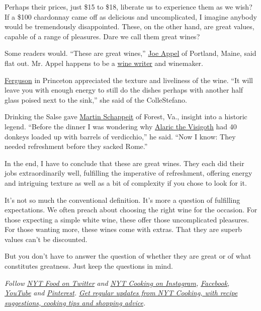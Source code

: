 Perhaps their prices, just \$15 to \$18, liberate us to experience them
as we wish? If a \$100 chardonnay came off as delicious and
uncomplicated, I imagine anybody would be tremendously disappointed.
These, on the other hand, are great values, capable of a range of
pleasures. Dare we call them great wines?

Some readers would. ``These are great wines,''
\href{https://www.nytimes3xbfgragh.onion/2020/07/02/dining/drinks/wine-school-assignment-verdicchio-di-matelica.html\#commentsContainer\&permid=108034206}{Joe
Appel} of Portland, Maine, said flat out. Mr. Appel happens to be a
\href{https://twitter.com/joeyappel?lang=en}{wine writer} and winemaker.

\href{https://www.nytimes3xbfgragh.onion/2020/07/02/dining/drinks/wine-school-assignment-verdicchio-di-matelica.html\#commentsContainer\&permid=108072656}{Ferguson}
in Princeton appreciated the texture and liveliness of the wine. ``It
will leave you with enough energy to still do the dishes perhaps with
another half glass poised next to the sink,'' she said of the
ColleStefano.

Drinking the Salse gave
\href{https://www.nytimes3xbfgragh.onion/2020/07/02/dining/drinks/wine-school-assignment-verdicchio-di-matelica.html\#commentsContainer\&permid=108094105}{Martin
Schappeit} of Forest, Va., insight into a historic legend. ``Before the
dinner I was wondering why
\href{https://www.empson.com/territory/marche/verdicchio/}{Alaric the
Visigoth} had 40 donkeys loaded up with barrels of verdicchio,'' he
said. ``Now I know: They needed refreshment before they sacked Rome.''

In the end, I have to conclude that these are great wines. They each did
their jobs extraordinarily well, fulfilling the imperative of
refreshment, offering energy and intriguing texture as well as a bit of
complexity if you chose to look for it.

It's not so much the conventional definition. It's more a question of
fulfilling expectations. We often preach about choosing the right wine
for the occasion. For those expecting a simple white wine, these offer
those uncomplicated pleasures. For those wanting more, these wines come
with extras. That they are superb values can't be discounted.

But you don't have to answer the question of whether they are great or
of what constitutes greatness. Just keep the questions in mind.

\emph{Follow} \emph{\href{https://twitter.com/nytfood}{NYT Food on
Twitter}} \emph{and}
\emph{\href{https://www.instagram.com/nytcooking/}{NYT Cooking on
Instagram},}
\emph{\href{https://www.facebookcorewwwi.onion/nytcooking/}{Facebook},}
\emph{\href{https://www.youtube.com/nytcooking}{YouTube}} \emph{and}
\emph{\href{https://www.pinterest.com/nytcooking/}{Pinterest}.}
\emph{\href{https://www.nytimes3xbfgragh.onion/newsletters/cooking}{Get
regular updates from NYT Cooking, with recipe suggestions, cooking tips
and shopping advice}.}

